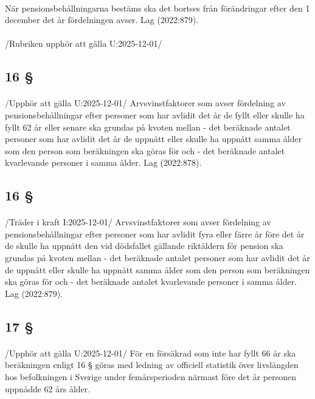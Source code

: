 \documentclass[a4paper,notitlepage,openany,10pt]{book}
\begin{document}
\paragraph*{}
När pensionsbehållningarna bestäms ska det bortses från förändringar efter den 1 december det år fördelningen avser.
Lag (2022:879).
\paragraph*{}
/Rubriken upphör att gälla U:2025-12-01/
\subsection*{16 §}
\paragraph*{}
/Upphör att gälla U:2025-12-01/
Arvsvinstfaktorer som avser fördelning av pensionsbehållningar efter personer som har avlidit det år de fyllt eller skulle ha fyllt 62 år eller senare ska grundas på kvoten mellan
\newline - det beräknade antalet personer som har avlidit det år de uppnått eller skulle ha uppnått samma ålder som den person som beräkningen ska göras för och
\newline - det beräknade antalet kvarlevande personer i samma ålder.
Lag (2022:878).
\subsection*{16 §}
\paragraph*{}
/Träder i kraft I:2025-12-01/
Arvsvinstfaktorer som avser fördelning av pensionsbehållningar efter personer som har avlidit fyra eller färre år före det år de skulle ha uppnått den vid dödsfallet gällande riktåldern för pension ska grundas på kvoten mellan
\newline - det beräknade antalet personer som har avlidit det år de uppnått eller skulle ha uppnått samma ålder som den person som beräkningen ska göras för och
\newline - det beräknade antalet kvarlevande personer i samma ålder.
Lag (2022:879).
\subsection*{17 §}
\paragraph*{}
/Upphör att gälla U:2025-12-01/
För en försäkrad som inte har fyllt 66 år ska beräkningen enligt 16 § göras med ledning av officiell statistik över livslängden hos befolkningen i Sverige under femårsperioden närmast före det år personen uppnådde 62 års ålder.
\end{document}
